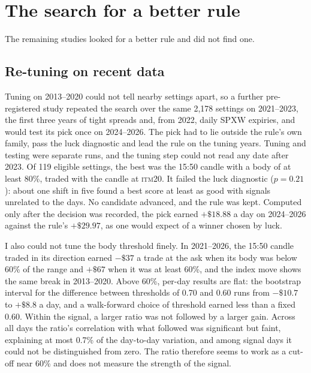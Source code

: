 \documentclass[12pt,letterpaper]{article}
\newcommand{\ITM}[1]{\textsc{itm}#1}
\begin{document}
\section{The search for a better rule}
\label{sec:search}

The remaining studies looked for a better rule and did not find one.

\subsection{Re-tuning on recent data}
\label{sec:retune}

Tuning on 2013--2020 could not tell nearby settings apart, so a further
pre-registered study repeated the search over the same 2{,}178 settings on
2021--2023, the first three years of tight spreads and, from 2022, daily SPXW
expiries, and would test its pick once on 2024--2026. The pick had to lie
outside the rule's own family, pass the luck diagnostic and lead the rule on the
tuning years. Tuning and testing were separate runs, and the tuning step could
not read any date after 2023. Of 119 eligible settings, the best was the 15:50
candle with a body of at least 80\%, traded with the candle at \ITM{20}. It failed
the luck diagnostic ($p = 0.21$): about one shift in five found a best score at
least as good with signals unrelated to the days. No candidate advanced, and the rule was kept. Computed only after the decision
was recorded, the pick earned $+\$18.88$ a day on 2024--2026 against the rule's
$+\$29.97$, as one would expect of a winner chosen by luck.

I also could not tune the body threshold finely. In 2021--2026, the 15:50 candle
traded in its direction earned $-\$37$ a trade at the ask when its body was below
60\% of the range and $+\$67$ when it was at least 60\%, and the index move shows
the same break in 2013--2020. Above 60\%, per-day results are flat: the bootstrap
interval for the difference between thresholds of 0.70 and 0.60 runs from
$-\$10.7$ to $+\$8.8$ a day, and a walk-forward choice of threshold earned less
than a fixed 0.60. Within the signal, a larger ratio was not followed by a larger
gain. Across all days the ratio's correlation with what followed was significant
but faint, explaining at most 0.7\% of the day-to-day variation, and among signal
days it could not be distinguished from zero. The ratio therefore seems to work as a cut-off near 60\% and does not measure
the strength of the signal.
\end{document}
